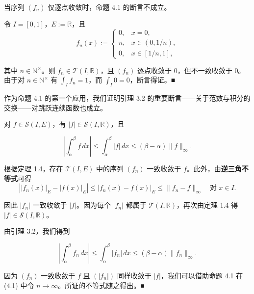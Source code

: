 \begin{remark}

当序列 $ (f_n) $ 仅逐点收敛时，命题 4.1 的断言不成立。

\proofhead
令 $ I = [0, 1] $，$ E := \mathbb{R} $，且
\begin{equation*}
f_n(x) := \begin{cases} 0, & x = 0, \\ n, & x \in (0, 1/n), \\ 0, & x \in [1/n, 1], \end{cases}
\end{equation*}

其中 $ n \in \mathbb{N}^{\times} $。则 $ f_n \in \mathcal{T}(I, \mathbb{R}) $，且 $ (f_n) $ 逐点收敛于 0，但不一致收敛于 0。由于对 $ n \in \mathbb{N}^{\times} $ 有 $ \int_{I} f_n = 1 $，而 $ \int_{I} 0 = 0 $，断言得证。\nobreak\hspace{0.35em}■

作为命题 4.1 的第一个应用，我们证明引理 3.2 的重要断言——关于范数与积分的交换——对跳跃连续函数也成立。

\end{remark}

\begin{proposition}

对 $ f \in \mathcal{S}(I, E) $，有 $ |f| \in \mathcal{S}(I, \mathbb{R}) $，且

\[
\left| \int_{\alpha}^{\beta} f \, dx \right| \le \int_{\alpha}^{\beta} |f| \, dx \le (\beta - \alpha)\|f\|_{\infty} .
\]

\proofhead
根据定理 1.4，存在 $ \mathcal{T}(I, E) $ 中的序列 $ (f_n) $ 一致收敛于 $ f $。此外，由\textbf{逆三角不等式}可得
\[
\left| |f_n(x)|_{E} - |f(x)|_{E} \right| \le |f_n(x) - f(x)|_{E} \le \|f_n - f\|_{\infty} \quad \text{对 } x \in I .
\]

因此 $ |f_n| $ 一致收敛于 $ |f| $。因为每个 $ |f_n| $ 都属于 $ \mathcal{T}(I, \mathbb{R}) $，再次由定理 1.4 得 $ |f| \in \mathcal{S}(I, \mathbb{R}) $。

由引理 3.2，我们得到

\begin{equation}
\left| \int_{\alpha}^{\beta} f_n \, dx \right| \le \int_{\alpha}^{\beta} |f_n| \, dx \le (\beta - \alpha)\|f_n\|_{\infty} .\tag{4.1}
\end{equation}

因为 $ (f_n) $ 一致收敛于 $ f $ 且 $ (|f_n|) $ 同样收敛于 $ |f| $，我们可以借助命题 4.1 在 (4.1) 中令 $ n \to \infty $。所证的不等式随之得出。\nobreak\hspace{0.35em}■

\end{proposition}

